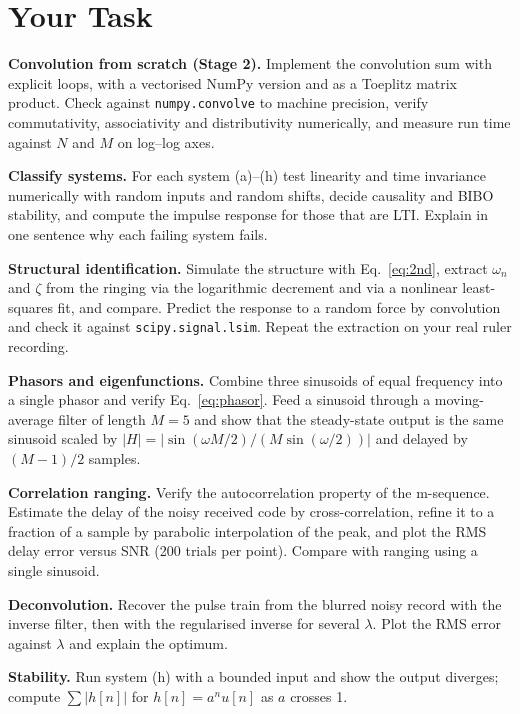 \documentclass[11pt,a4paper]{article}
\begin{document}
\section*{Your Task}
\begin{tasks}
  \item \textbf{Convolution from scratch (Stage 2).} Implement the convolution sum with explicit loops, with a vectorised NumPy version and as a Toeplitz matrix product. Check against \texttt{numpy.convolve} to machine precision, verify commutativity, associativity and distributivity numerically, and measure run time against $N$ and $M$ on log--log axes.
  \item \textbf{Classify systems.} For each system (a)--(h) test linearity and time invariance numerically with random inputs and random shifts, decide causality and BIBO stability, and compute the impulse response for those that are LTI. Explain in one sentence why each failing system fails.
  \item \textbf{Structural identification.} Simulate the structure with Eq.~\eqref{eq:2nd}, extract $\omega_n$ and $\zeta$ from the ringing via the logarithmic decrement and via a nonlinear least-squares fit, and compare. Predict the response to a random force by convolution and check it against \texttt{scipy.signal.lsim}. Repeat the extraction on your real ruler recording.
  \item \textbf{Phasors and eigenfunctions.} Combine three sinusoids of equal frequency into a single phasor and verify Eq.~\eqref{eq:phasor}. Feed a sinusoid through a moving-average filter of length $M=5$ and show that the steady-state output is the same sinusoid scaled by $|H|=\left|\sin(\omega M/2)/(M\sin(\omega/2))\right|$ and delayed by $(M-1)/2$ samples.
  \item \textbf{Correlation ranging.} Verify the autocorrelation property of the m-sequence. Estimate the delay of the noisy received code by cross-correlation, refine it to a fraction of a sample by parabolic interpolation of the peak, and plot the RMS delay error versus SNR (200 trials per point). Compare with ranging using a single sinusoid.
  \item \textbf{Deconvolution.} Recover the pulse train from the blurred noisy record with the inverse filter, then with the regularised inverse for several $\lambda$. Plot the RMS error against $\lambda$ and explain the optimum.
  \item \textbf{Stability.} Run system (h) with a bounded input and show the output diverges; compute $\sum|h[n]|$ for $h[n]=a^nu[n]$ as $a$ crosses 1.
\end{tasks}
\end{document}
